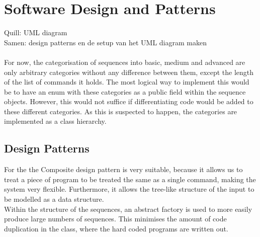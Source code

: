 \chapter{Software Design and Patterns}
Quill: UML diagram\\


Samen: design patterns en de setup van het UML diagram maken\\~\\

For now, the categorisation of sequences into basic, medium and advanced are only arbitrary categories without any difference between them, except the length of the list of commands it holds. The most logical way to implement this would be to have an enum with these categories as a public field within the sequence objects. However, this would not suffice if differentiating code would be added to these different categories. As this is suspected to happen, the categories are implemented as a class hierarchy. 

\section{Design Patterns}
For the  the Composite design pattern is very suitable, because it allows us to treat a piece of program to be treated the same as a single command, making the system very flexible. Furthermore, it allows the tree-like structure of the input to be modelled as a data structure. \\

Within the structure of the sequences, an abstract factory is used to more easily produce large numbers of sequences. This minimises the amount of code duplication in the  class, where the hard coded programs are written out. 
